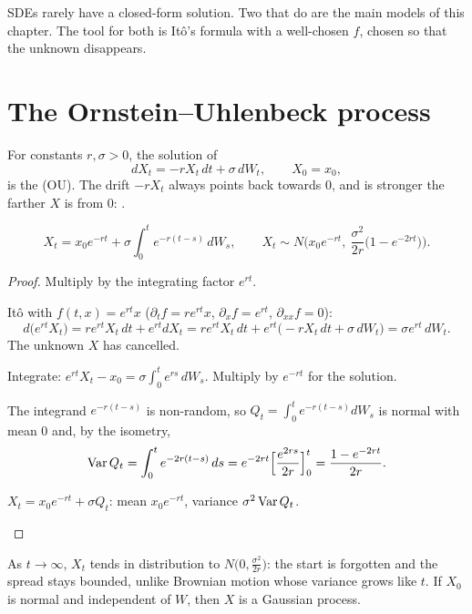 SDEs rarely have a closed-form solution. Two that do are the main models of this chapter. The tool for both is Itô's formula with a well-chosen $f$, chosen so that the unknown disappears.

\section{The Ornstein--Uhlenbeck process}

\begin{definition}
For constants $r,\sigma>0$, the solution of
\[
  dX_t=-rX_t\,dt+\sigma\,dW_t,\qquad X_0=x_0,
\]
is the  (OU). The drift $-rX_t$ always points back towards $0$, and is stronger the farther $X$ is from $0$: .
\end{definition}

\begin{theorem}
\label{thm:ou}
\[
  X_t=x_0e^{-rt}+\sigma\int_0^te^{-r(t-s)}\,dW_s,
  \qquad
  X_t\sim N\Big(x_0e^{-rt},\ \frac{\sigma^2}{2r}\big(1-e^{-2rt}\big)\Big).
\]
\end{theorem}
\begin{proof}
Multiply by the integrating factor $e^{rt}$.
\begin{steps}
  \item Itô with $f(t,x)=e^{rt}x$ ($\partial_tf=re^{rt}x$, $\partial_xf=e^{rt}$, $\partial_{xx}f=0$):
  \[
    d\big(e^{rt}X_t\big)=re^{rt}X_t\,dt+e^{rt}dX_t=re^{rt}X_t\,dt+e^{rt}\big(-rX_t\,dt+\sigma\,dW_t\big)=\sigma e^{rt}\,dW_t .
  \]
  The unknown $X$ has cancelled.
  \item Integrate: $e^{rt}X_t-x_0=\sigma\int_0^te^{rs}\,dW_s$. Multiply by $e^{-rt}$ for the solution.
  \item The integrand $e^{-r(t-s)}$ is non-random, so $Q_t=\int_0^te^{-r(t-s)}dW_s$ is normal with mean $0$ and, by the isometry,
  \[
    \operatorname{Var} Q_t=\int_0^te^{-2r(t-s)}\,ds=e^{-2rt}\Big[\frac{e^{2rs}}{2r}\Big]_0^t=\frac{1-e^{-2rt}}{2r}.
  \]
  \item $X_t=x_0e^{-rt}+\sigma Q_t$: mean $x_0e^{-rt}$, variance $\sigma^2\operatorname{Var} Q_t$. \qedhere
\end{steps}
\end{proof}

As $t\to\infty$, $X_t$ tends in distribution to $N\big(0,\frac{\sigma^2}{2r}\big)$: the start is forgotten and the spread stays bounded, unlike Brownian motion whose variance grows like $t$. If $X_0$ is normal and independent of $W$, then $X$ is a Gaussian process.

